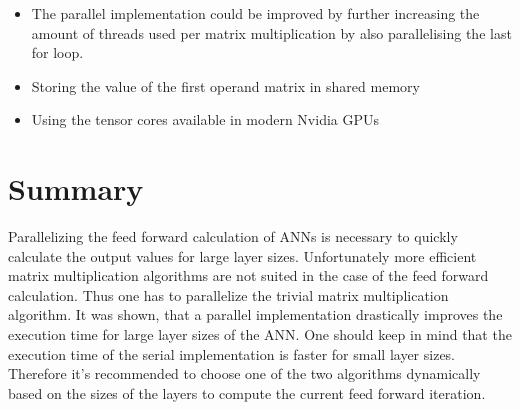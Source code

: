 \documentclass[sigconf]{acmart}
\begin{document}
\begin{itemize}
    \item{The parallel implementation could be improved by further increasing the amount of threads used per matrix multiplication by also parallelising the last for loop.}
    \item{Storing the value of the first operand matrix in shared memory}
    \item{Using the tensor cores available in modern Nvidia GPUs}
\end{itemize}


\section{Summary}
Parallelizing the feed forward calculation of ANNs is necessary to quickly calculate the output values for large layer sizes.
Unfortunately more efficient matrix multiplication algorithms are not suited in the case of the feed forward calculation. Thus one has to parallelize the trivial
matrix multiplication algorithm.
It was shown, that a parallel implementation drastically improves the execution time for large layer sizes of the ANN.
One should keep in mind that the execution time of the serial implementation is faster for small layer sizes. Therefore it's recommended to choose one of the two algorithms dynamically
based on the sizes of the layers to compute the current feed forward iteration.
\end{document}
